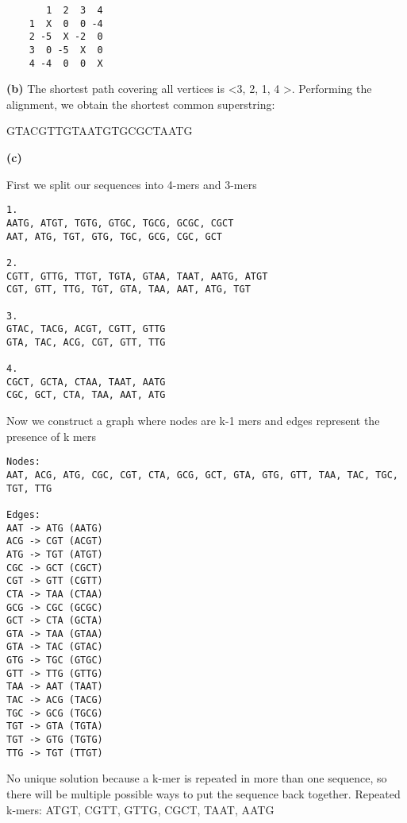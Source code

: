 \documentclass[11pt,letterpaper]{article}
\renewcommand{\part}[1] {\vspace{.10in} {\bf (#1)}}
\begin{document}
\begin{verbatim}
       1  2  3  4
    1  X  0  0 -4
    2 -5  X -2  0
    3  0 -5  X  0
    4 -4  0  0  X
\end{verbatim}

\part{b}
The shortest path covering all vertices is \textless 3, 2, 1, 4 \textgreater.
Performing the alignment, we obtain the shortest common superstring:

    GTACGTTGTAATGTGCGCTAATG

\part{c}

First we split our sequences into 4-mers and 3-mers

\begin{verbatim}
1.
AATG, ATGT, TGTG, GTGC, TGCG, GCGC, CGCT
AAT, ATG, TGT, GTG, TGC, GCG, CGC, GCT

2.
CGTT, GTTG, TTGT, TGTA, GTAA, TAAT, AATG, ATGT
CGT, GTT, TTG, TGT, GTA, TAA, AAT, ATG, TGT

3.
GTAC, TACG, ACGT, CGTT, GTTG
GTA, TAC, ACG, CGT, GTT, TTG

4.
CGCT, GCTA, CTAA, TAAT, AATG
CGC, GCT, CTA, TAA, AAT, ATG
\end{verbatim}

Now we construct a graph where nodes are k-1 mers and edges represent the presence of k mers

\begin{verbatim}
Nodes:
AAT, ACG, ATG, CGC, CGT, CTA, GCG, GCT, GTA, GTG, GTT, TAA, TAC, TGC, TGT, TTG

Edges:
AAT -> ATG (AATG)
ACG -> CGT (ACGT)
ATG -> TGT (ATGT)
CGC -> GCT (CGCT)
CGT -> GTT (CGTT)
CTA -> TAA (CTAA)
GCG -> CGC (GCGC)
GCT -> CTA (GCTA)
GTA -> TAA (GTAA)
GTA -> TAC (GTAC)
GTG -> TGC (GTGC)
GTT -> TTG (GTTG)
TAA -> AAT (TAAT)
TAC -> ACG (TACG)
TGC -> GCG (TGCG)
TGT -> GTA (TGTA)
TGT -> GTG (TGTG)
TTG -> TGT (TTGT)
\end{verbatim}


No unique solution because a k-mer is repeated in more than one sequence, so there will be multiple possible ways to put the sequence back together.
Repeated k-mers: ATGT, CGTT, GTTG, CGCT, TAAT, AATG
\end{document}
